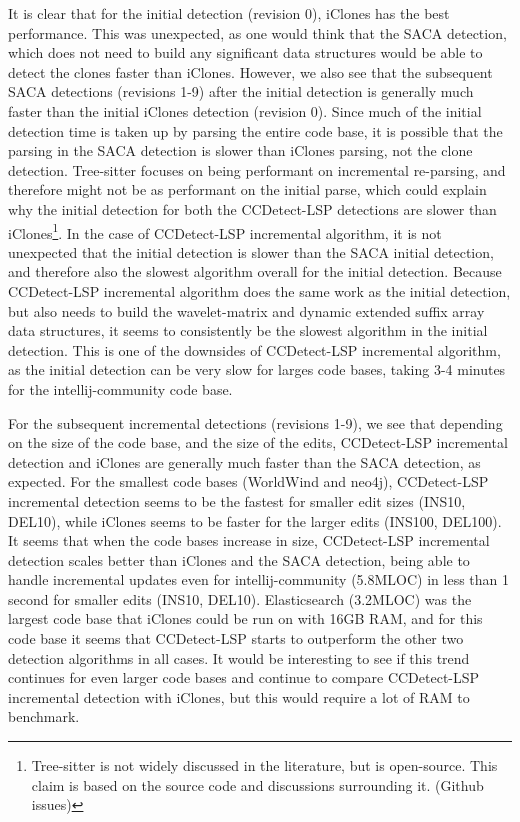 It is clear that for the initial detection (revision 0), iClones has the best performance.
This was unexpected, as one would think that the SACA detection, which does not need to
build any significant data structures would be able to detect the clones faster than
iClones. However, we also see that the subsequent SACA detections (revisions 1-9) after
the initial detection is generally much faster than the initial iClones detection
(revision 0). Since much of the initial detection time is taken up by parsing the entire
code base, it is possible that the parsing in the SACA detection is slower than iClones
parsing, not the clone detection. Tree-sitter focuses on being performant on incremental
re-parsing, and therefore might not be as performant on the initial parse, which could
explain why the initial detection for both the CCDetect-LSP detections are slower than
iClones\footnote{Tree-sitter is not widely discussed in the literature, but is
open-source. This claim is based on the source code and discussions surrounding it.
(Github issues)}. In the case of CCDetect-LSP incremental algorithm, it is not unexpected
that the initial detection is slower than the SACA initial detection, and therefore also
the slowest algorithm overall for the initial detection. Because CCDetect-LSP incremental
algorithm does the same work as the initial detection, but also needs to build the
wavelet-matrix and dynamic extended suffix array data structures, it seems to consistently
be the slowest algorithm in the initial detection. This is one of the downsides of
CCDetect-LSP incremental algorithm, as the initial detection can be very slow for larges
code bases, taking 3-4 minutes for the intellij-community code base.


For the subsequent incremental detections (revisions 1-9), we see that depending on the
size of the code base, and the size of the edits, CCDetect-LSP incremental detection and
iClones are generally much faster than the SACA detection, as expected. For the smallest
code bases (WorldWind and neo4j), CCDetect-LSP incremental detection seems to be the
fastest for smaller edit sizes (INS10, DEL10), while iClones seems to be faster for the
larger edits (INS100, DEL100). It seems that when the code bases increase in size,
CCDetect-LSP incremental detection scales better than iClones and the SACA detection,
being able to handle incremental updates even for intellij-community (5.8MLOC) in less
than 1 second for smaller edits (INS10, DEL10). Elasticsearch (3.2MLOC) was the largest
code base that iClones could be run on with 16GB RAM, and for this code base it seems that
CCDetect-LSP starts to outperform the other two detection algorithms in all cases. It
would be interesting to see if this trend continues for even larger code bases and
continue to compare CCDetect-LSP incremental detection with iClones, but this would
require a lot of RAM to benchmark.

